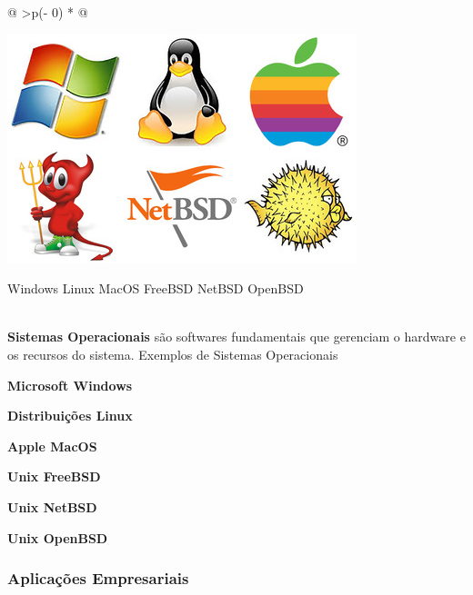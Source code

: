\documentclass[
]{book}
\begin{document}
\begin{longtable}[]{@{}
  >{\centering\arraybackslash}p{(\columnwidth - 0\tabcolsep) * }@{}}
\toprule\noalign{}
\endhead
\bottomrule\noalign{}
\endlastfoot
\begin{minipage}[t]{\linewidth}\centering
\begin{center}
\includegraphics{images/InfraEstrutura/software/so.jpg}

Windows Linux MacOS FreeBSD NetBSD OpenBSD
\end{center}
\end{minipage} \\
\textbf{Sistemas Operacionais} são softwares fundamentais que gerenciam o hardware e os recursos do sistema. Exemplos de Sistemas Operacionais

\textbf{Microsoft Windows}

\textbf{Distribuições Linux}

\textbf{Apple MacOS}

\textbf{Unix FreeBSD}

\textbf{Unix NetBSD}

\textbf{Unix OpenBSD} \\
\end{longtable}

\subsubsection{Aplicações Empresariais}\label{aplicauxe7uxf5es-empresariais}
\end{document}
